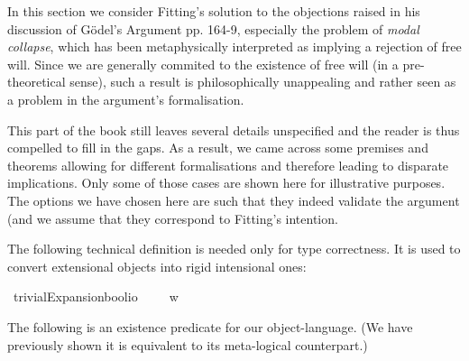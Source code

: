 %
\begin{isabellebody}%
%
%
\isadelimtheory
%
\endisadelimtheory
%
\isatagtheory
%
\endisatagtheory
{\isafoldtheory}%
%
\isadelimtheory
%
\endisadelimtheory
%
\isamarkuptrue%
%
\begin{isamarkuptext}%
In this section we consider Fitting's solution to the objections raised in his discussion of G\"odel's Argument pp. 164-9, 
especially the problem of \emph{modal collapse}, which has been metaphysically interpreted as implying a rejection of free will.
Since we are generally commited to the existence of free will (in a pre-theoretical sense), such a result is
philosophically unappealing and rather seen as a problem in the argument's formalisation.%
\end{isamarkuptext}\isamarkuptrue%
%
\begin{isamarkuptext}%
This part of the book still leaves several details unspecified and the reader is thus compelled to fill in the gaps.
As a result, we came across some premises and theorems allowing for different formalisations and therefore leading to disparate implications.
Only some of those cases are shown here for illustrative purposes. The options we have chosen here are such that
they indeed validate the argument (and we assume that they correspond to Fitting's intention.%
\end{isamarkuptext}\isamarkuptrue%
%
\isamarkuptrue%
%
\begin{isamarkuptext}%
The following technical definition is needed only for type correctness. It is used to convert
 extensional objects into rigid intensional ones:%
\end{isamarkuptext}\isamarkuptrue%
\isamarkupfalse%
\ trivialExpansion{\isacharcolon}{\isacharcolon}{\isachardoublequoteopen}bool{\isasymRightarrow}io{\isachardoublequoteclose}\ {\isacharparenleft}{\isachardoublequoteopen}{\isasymlparr}{\isacharunderscore}{\isasymrparr}{\isachardoublequoteclose}{\isacharparenright}\ \ {\isachardoublequoteopen}{\isasymlparr}{\isasymphi}{\isasymrparr}\ {\isasymequiv}\ {\isasymlambda}w{\isachardot}\ {\isasymphi}{\isachardoublequoteclose}%
\begin{isamarkuptext}%
The following is an existence predicate for our object-language. (We have previously shown it is equivalent to its
 meta-logical counterpart.)%
\end{isamarkuptext}\isamarkuptrue%
\isamarkupfalse%

\end{isabellebody}
